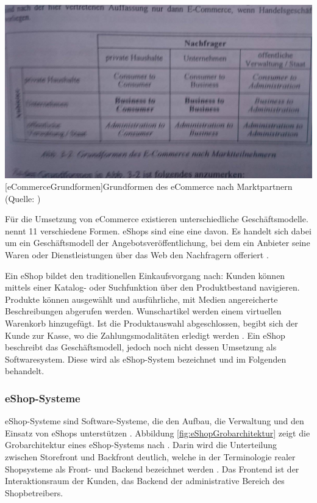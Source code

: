\documentclass[12pt,a4paper,bibliography=totocnumbered,listof=totoc]{scrartcl}
\begin{document}
\vspace{1em}
\begin{minipage}{\linewidth}
	\centering
	\includegraphics[width=0.7\linewidth]{Abbildungen/eCommerceGrundformen.jpg}
	[eCommerceGrundformen]{Grundformen des eCommerce nach Marktpartnern (Quelle: \citet{schwarze02})}
	\label{fig:eCommerceGrundformen}
\end{minipage}
\vspace{1em}

Für die Umsetzung von eCommerce existieren unterschiedliche Geschäftsmodelle. \citet{timmers98} nennt 11 verschiedene Formen. eShops sind eine eine davon. Es handelt sich dabei um ein \glqq Geschäftsmodell der Angebotsveröffentlichung, bei dem ein Anbieter seine Waren oder Dienstleistungen über das Web den Nachfragern offeriert\grqq{} \citep{bartelt00}.

Ein eShop bildet den traditionellen Einkaufsvorgang nach: Kunden können mittels einer Katalog- oder Suchfunktion über den Produktbestand navigieren. Produkte können ausgewählt und ausführliche, mit Medien angereicherte Beschreibungen abgerufen werden. Wunschartikel werden einem virtuellen Warenkorb hinzugefügt. Ist die Produktauswahl abgeschlossen, begibt sich der Kunde zur \glqq Kasse\grqq{}, wo die Zahlungsmodalitäten erledigt werden \citep{boles00}. Ein eShop beschreibt das Geschäftsmodell, jedoch noch nicht dessen Umsetzung als Softwaresystem. Diese wird als eShop-System bezeichnet \citep{boles00} und im Folgenden behandelt.

\subsubsection{eShop-Systeme}
\glqq eShop-Systeme sind Software-Systeme, die den Aufbau, die Verwaltung und den Einsatz von eShops unterstützen\grqq{} \citep{boles00}. Abbildung \ref{fig:eShopGrobarchitektur} zeigt die Grobarchitektur eines eShop-Systems nach \citeauthor{meier12}. Darin wird die Unterteilung zwischen Storefront und Backfront deutlich, welche in der Terminologie realer Shopsysteme als Front- und Backend bezeichnet werden \citep[vgl.][]{shopwareDoku}. Das Frontend ist der Interaktionsraum der Kunden, das Backend der administrative Bereich des Shopbetreibers.
\end{document}
